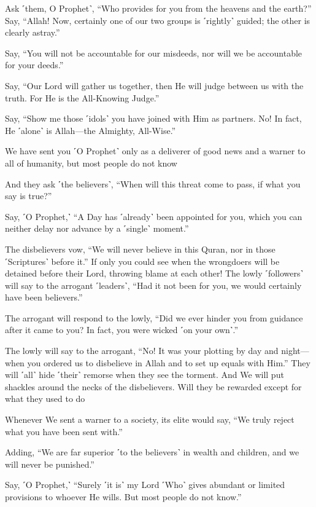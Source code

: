 Ask ˹them, O Prophet˺, “Who provides for you from the heavens and the earth?” Say, “Allah! Now, certainly one of our two groups is ˹rightly˺ guided; the other is clearly astray.”

Say, “You will not be accountable for our misdeeds, nor will we be accountable for your deeds.”

Say, “Our Lord will gather us together, then He will judge between us with the truth. For He is the All-Knowing Judge.”

Say, “Show me those ˹idols˺ you have joined with Him as partners. No! In fact, He ˹alone˺ is Allah—the Almighty, All-Wise.”

We have sent you ˹O Prophet˺ only as a deliverer of good news and a warner to all of humanity, but most people do not know

And they ask ˹the believers˺, “When will this threat come to pass, if what you say is true?”

Say, ˹O Prophet,˺ “A Day has ˹already˺ been appointed for you, which you can neither delay nor advance by a ˹single˺ moment.”

The disbelievers vow, “We will never believe in this Quran, nor in those ˹Scriptures˺ before it.” If only you could see when the wrongdoers will be detained before their Lord, throwing blame at each other! The lowly ˹followers˺ will say to the arrogant ˹leaders˺, “Had it not been for you, we would certainly have been believers.”

The arrogant will respond to the lowly, “Did we ever hinder you from guidance after it came to you? In fact, you were wicked ˹on your own˺.”

The lowly will say to the arrogant, “No! It was your plotting by day and night—when you ordered us to disbelieve in Allah and to set up equals with Him.” They will ˹all˺ hide ˹their˺ remorse when they see the torment. And We will put shackles around the necks of the disbelievers. Will they be rewarded except for what they used to do

Whenever We sent a warner to a society, its elite would say, “We truly reject what you have been sent with.”

Adding, “We are far superior ˹to the believers˺ in wealth and children, and we will never be punished.”

Say, ˹O Prophet,˺ “Surely ˹it is˺ my Lord ˹Who˺ gives abundant or limited provisions to whoever He wills. But most people do not know.”


